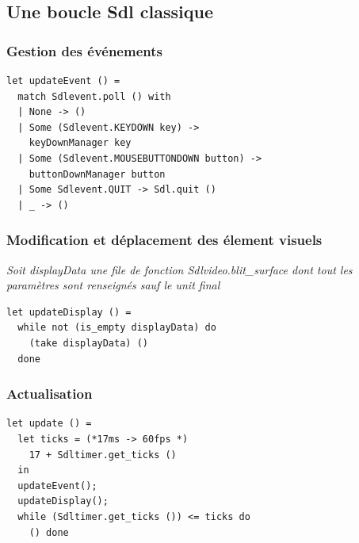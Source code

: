 \subsection{Une boucle Sdl classique} %
\begin{frame}[fragile]
	\frametitle{Gestion des événements}
	\begin{lstlisting}
let updateEvent () = 
  match Sdlevent.poll () with
  | None -> ()
  | Some (Sdlevent.KEYDOWN key) -> 
    keyDownManager key
  | Some (Sdlevent.MOUSEBUTTONDOWN button) -> 
    buttonDownManager button
  | Some Sdlevent.QUIT -> Sdl.quit ()
  | _ -> ()
	\end{lstlisting}
\end{frame}

\begin{frame}[fragile]
	\frametitle{Modification et déplacement des élement visuels}
	\textit{Soit displayData une file de fonction Sdlvideo.blit\_surface dont tout les paramètres sont renseignés sauf le unit final}
	\begin{lstlisting}
let updateDisplay () = 
  while not (is_empty displayData) do
    (take displayData) ()
  done
	\end{lstlisting}
\end{frame}

\begin{frame}[fragile]
	\frametitle{Actualisation}
	\begin{lstlisting}
let update () =
  let ticks = (*17ms -> 60fps *) 
    17 + Sdltimer.get_ticks () 
  in
  updateEvent();
  updateDisplay();
  while (Sdltimer.get_ticks ()) <= ticks do 
    () done
	\end{lstlisting}
\end{frame}
